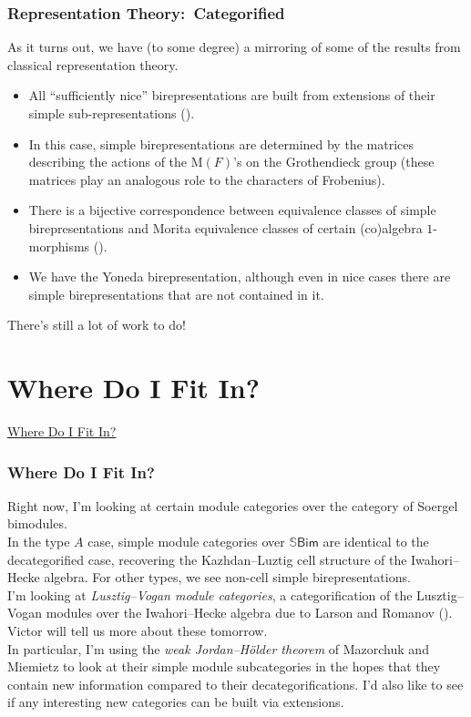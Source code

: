 \documentclass{beamer}
\newcommand{\textcat}[1]{\mathrm{\textsf{#1}}}
\newcommand*{\emphasis}[1]{\textcolor{structure}{\em #1}}
\begin{document}
\begin{frame}
\frametitle{Representation Theory:\ Categorified}
As it turns out, we have (to some degree) a mirroring of some of the results from classical representation theory.\\[2ex]
\begin{itemize}
\item All ``sufficiently nice'' birepresentations are built from extensions of their simple sub-representations (\textcolor{structure}{\cite{MM16}}).
\item In this case, simple birepresentations are determined by the matrices describing the actions of the $\mathrm{M}(F)$'s on the Grothendieck group (these matrices play an analogous role to the characters of Frobenius).
\item There is a bijective correspondence between equivalence classes of simple birepresentations and Morita equivalence classes of certain (co)algebra $1$-morphisms (\textcolor{structure}{\cite{MMMT19}}).
\item We have the Yoneda birepresentation, although even in nice cases there are simple birepresentations that are not contained in it.\\[2ex]
\end{itemize}
There's still a lot of work to do!
\end{frame}


\section{Where Do I Fit In?}

\begin{frame}
\centerline{\huge\textcolor{structure}{\underline{Where Do I Fit In?}}}
\end{frame}

\begin{frame}
\frametitle{Where Do I Fit In?}
Right now, I'm looking at certain module categories over the category of Soergel bimodules.\\[2ex]
In the type $A$ case, simple module categories over $\mathbb{S}\textcat{Bim}$ are identical to the decategorified case, recovering the Kazhdan--Luztig cell structure of the Iwahori--Hecke algebra. For other types, we see non-cell simple birepresentations.\\[2ex]
I'm looking at \emphasis{Lusztig--Vogan module categories}, a categorification of the Lusztig--Vogan modules over the Iwahori--Hecke algebra due to Larson and Romanov (\textcolor{structure}{\cite{LR22}}). Victor will tell us more about these tomorrow.\\[2ex]
In particular, I'm using the \emphasis{weak Jordan--H\"{o}lder theorem} of Mazorchuk and Miemietz  to look at their simple module subcategories in the hopes that they contain new information compared to their decategorifications. I'd also like to see if any interesting new categories can be built via extensions.
\end{frame}
\end{document}
